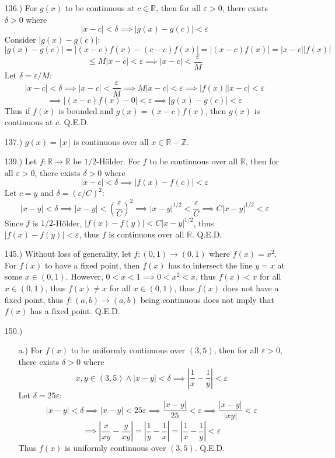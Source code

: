 \documentclass[12pt]{article}
\newcommand{\vertb}[1]{\left\vert#1\right\vert}
\newcommand{\parns}[1]{\left(#1\right)}
\newcommand{\e}{\varepsilon}
\begin{document}
\begin{itemize}
    \item [136.)] For $g(x)$ to be continuous at $c\in\mathbb R$, then for all $\e>0$, there exists $\delta>0$ where
    \[\vertb{x-c}<\delta\implies\vertb{g(x)-g(c)}<\e\]
    Consider $\vertb{g(x)-g(c)}$:
    \[\vertb{g(x)-g(c)}=\vertb{(x-c)f(x)-(c-c)f(x)}=\vertb{(x-c)f(x)}=\vertb{x-c}\vertb{f(x)}\]
    \[\leq M\vertb{x-c}<\e\implies\vertb{x-c}<\frac{\e}{M}\]
    Let $\delta=\e/M$:
    \[\vertb{x-c}<\delta\implies\vertb{x-c}<\frac{\e}{M}\implies M\vertb{x-c}<\e\implies \vertb{f(x)}\vertb{x-c}<\e\]
    \[\implies\vertb{(x-c)f(x)-0}<\e\implies\vertb{g(x)-g(c)}<\e\]
    Thus if $f(x)$ is bounded and $g(x)=(x-c)f(x)$, then $g(x)$ is continuous at $c$. Q.E.D.

    \item [137.)] $g(x)=\lfloor x\rfloor$ is continuous over all $x\in\mathbb{R}-\mathbb{Z}$.
 
    \item [139.)] Let $f:\mathbb R\to\mathbb R$ be $1/2$-H\"older. For $f$ to be continuous over all $\mathbb R$, then for all $\e>0$, there exists $\delta>0$ where
    \[\vertb{x-c}<\delta\implies\vertb{f(x)-f(c)}<\e\]
    Let $c=y$ and $\delta=(\e/C)^2$:
    \[\vertb{x-y}<\delta\implies\vertb{x-y}<\parns{\frac{\e}{C}}^2\implies\vertb{x-y}^{1/2}<\frac{\e}{C}\implies C\vertb{x-y}^{1/2}<\e\]
    Since $f$ is $1/2$-H\"older, $\vertb{f(x)-f(y)}<C\vertb{x-y}^{1/2}$, thus $\vertb{f(x)-f(y)}<\e$, thus $f$ is continuous over all $\mathbb{R}$. Q.E.D.

    \item [145.)] Without loss of generality, let $f:(0,1)\to(0,1)$ where $f(x)=x^2$. For $f(x)$ to have a fixed point, then $f(x)$ has to intersect the line $y=x$ at some $x\in(0,1)$. However, $0<x<1\implies0<x^2<x$, thus $f(x)<x$ for all $x\in(0,1)$, thus $f(x)\ne x$ for all $x\in(0,1)$, thus $f(x)$ does not have a fixed point, thus $f:(a,b)\to(a,b)$ being continuous does not imply that $f(x)$ has a fixed point. Q.E.D.

    \item [150.)] \begin{itemize}
        \item [a.)] For $f(x)$ to be uniformly continuous over $(3,5)$, then for all $\e>0$, there exists $\delta>0$ where
        \[x,y\in(3,5)\land\vertb{x-y}<\delta\implies\vertb{\frac{1}{x}-\frac{1}{y}}<\e\]
        Let $\delta=25\e$:
        \[\vertb{x-y}<\delta\implies\vertb{x-y}<25\e\implies\frac{\vertb{x-y}}{25}<\e\implies\frac{\vertb{x-y}}{\vertb{xy}}<\e\]
        \[\implies\vertb{\frac{x}{xy}-\frac{y}{xy}}=\vertb{\frac{1}{y}-\frac{1}{x}}=\vertb{\frac{1}{x}-\frac{1}{y}}<\e\]
        Thus $f(x)$ is uniformly continuous over $(3,5)$. Q.E.D.
        

\end{itemize}
\end{itemize}
\end{document}
